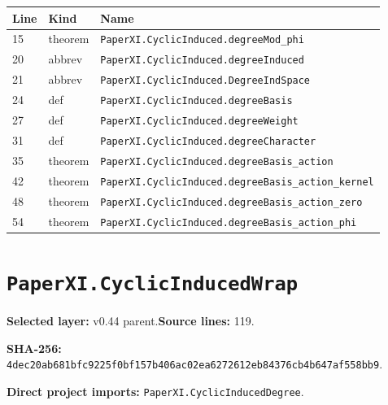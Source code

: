 \documentclass[10pt,oneside]{book}
\begin{document}
\begin{longtable}{@{}p{}p{}p{}@{}}\toprule Line&Kind&Name\\\midrule\endhead

15&theorem&\nolinkurl{PaperXI.CyclicInduced.degreeMod_phi}\\

20&abbrev&\nolinkurl{PaperXI.CyclicInduced.degreeInduced}\\

21&abbrev&\nolinkurl{PaperXI.CyclicInduced.DegreeIndSpace}\\

24&def&\nolinkurl{PaperXI.CyclicInduced.degreeBasis}\\

27&def&\nolinkurl{PaperXI.CyclicInduced.degreeWeight}\\

31&def&\nolinkurl{PaperXI.CyclicInduced.degreeCharacter}\\

35&theorem&\nolinkurl{PaperXI.CyclicInduced.degreeBasis_action}\\

42&theorem&\nolinkurl{PaperXI.CyclicInduced.degreeBasis_action_kernel}\\

48&theorem&\nolinkurl{PaperXI.CyclicInduced.degreeBasis_action_zero}\\

54&theorem&\nolinkurl{PaperXI.CyclicInduced.degreeBasis_action_phi}\\

\bottomrule\end{longtable}

\section{\texorpdfstring{\nolinkurl{PaperXI.CyclicInducedWrap}}{PaperXI.CyclicInducedWrap}}\label{module:PaperXI.CyclicInducedWrap}

\textbf{Selected layer:} v0.44 parent.\quad\textbf{Source lines:} 119.\par\textbf{SHA-256:} {\scriptsize\nolinkurl{4dec20ab681bfc9225f0bf157b406ac02ea6272612eb84376cb4b647af558bb9}}.


\textbf{Direct project imports:} \nolinkurl{PaperXI.CyclicInducedDegree}.
\end{document}
